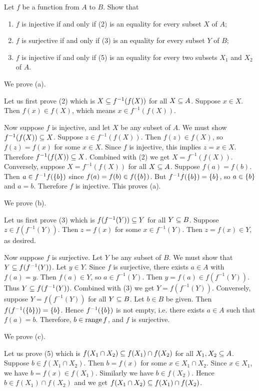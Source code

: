 \begin{exercise}
Let $f$ be a function from $A$ to $B$. Show that
\begin{enumerate}[label=(\alph*)]
    \item $f$ is injective if and only if (2) is an equality for every subset $X$ of $A$;
    \item $f$ is surjective if and only if (3) is an equality for every subset $Y$ of $B$;
    \item $f$ is injective if and only if (5) is an equality for every two subsets $X_1$ and $X_2$ of $A$.
\end{enumerate}
\end{exercise}

\begin{solution}
We prove (a).

Let us first prove (2) which is $X\subseteq f^{-1}(f(X))$ for all $X\subseteq A$.
Suppose $x\in X$. Then $f(x)\in f(X)$,
which means $x\in f^{-1}(f(X))$.

Now suppose $f$ is injective, and let $X$ be any subset of $A$. We must show $f^{-1}(f(X)) \subseteq X$.
Suppose $z\in f^{-1}(f(X))$. Then $f(z)\in f(X)$, so $f(z)=f(x)$ for some $x\in X$.
Since $f$ is injective, this implies $z=x\in X$. Therefore $f^{-1}(f(X)) \subseteq X$. Combined with (2)
we get $X = f^{-1}(f(X))$.
Conversely, suppose $X = f^{-1}(f(X))$ for all $X\subseteq A$. Suppose $f(a)=f(b)$.
Then $a\in f^{-1}f(\left\{b\right\})$ since $f(a)=f(b)\in f(\left\{b\right\})$.
But $f^{-1}f(\left\{b\right\})=\left\{b\right\}$, so $a\in\left\{b\right\}$ and $a=b$.
Therefore $f$ is injective. This proves (a).

We prove (b).

Let us first prove (3) which is $f(f^{-1}(Y))\subseteq Y$ for all $Y\subseteq B$.
Suppose $z\in f(f^{-1}(Y))$. Then $z=f(x)$ for some $x\in f^{-1}(Y)$.
Then $z=f(x)\in Y$, as desired.

Now suppose $f$ is surjective. Let $Y$ be any subset of $B$.
We must show that $Y\subseteq f(f^{-1}(Y))$. Let $y\in Y$.
Since $f$ is surjective, there exists $a\in A$ with $f(a)=y$.
Then $f(a)\in Y$, so $a\in f^{-1}(Y)$. Then $y=f(a)\in f(f^{-1}(Y))$.
Thus $Y\subseteq f(f^{-1}(Y))$. Combined with (3) we get $Y= f(f^{-1}(Y))$.
Conversely, suppose $Y= f(f^{-1}(Y))$ for all $Y\subseteq B$.
Let $b\in B$ be given. Then $f(f^{-1}(\left\{b\right\}))=\left\{b\right\}$.
Hence $f^{-1}(\left\{b\right\})$ is not empty, i.e. there exists $a\in A$ such that $f(a)=b$.
Therefore, $b\in\operatorname{range} f$, and $f$ is surjective.

We prove (c).

Let us prove (5) which is $f(X_1\cap X_2)\subseteq f(X_1)\cap f(X_2)$ for all $X_1,X_2\subseteq A$.
Suppose $b\in f(X_1\cap X_2)$. Then $b=f(x)$ for some $x\in X_1\cap X_2$.
Since $x\in X_1$, we have $b=f(x)\in f(X_1)$. Similarly we have $b\in f(X_2)$.
Hence $b\in f(X_1)\cap f(X_2)$ and we get $f(X_1\cap X_2)\subseteq f(X_1)\cap f(X_2)$.


\end{solution}
